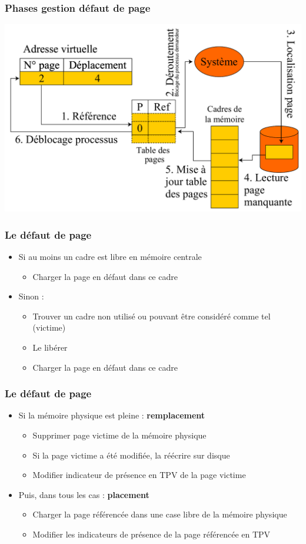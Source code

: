 \begin{frame}
\frametitle{Phases gestion défaut de page}
\includegraphics[width=\textwidth]{../illustration/traitement_defaut_page.pdf}
\end{frame}


\begin{frame}
\frametitle{Le défaut de page}
\begin{itemize}
\item Si au moins un cadre est libre en mémoire centrale
\begin{itemize}
\item Charger la page en défaut dans ce cadre
\end{itemize}
\item Sinon :
\begin{itemize}
\item Trouver un cadre non utilisé ou pouvant être considéré comme tel (victime)
\item Le libérer
\item Charger la page en défaut dans ce cadre
\end{itemize}
\end{itemize}

\end{frame}


\begin{frame}
\frametitle{Le défaut de page}
\begin{itemize}
\item Si la mémoire physique est pleine : \textbf{remplacement}
\begin{itemize}
\item Supprimer page victime de la mémoire physique
\item Si la page victime a été modifiée, la réécrire sur disque  
\item Modifier indicateur de présence en TPV de la page victime
\end{itemize}
\item Puis, dans tous les cas : \textbf{placement}
\begin{itemize}
\item Charger la page référencée dans une case libre de la mémoire physique
\item Modifier les indicateurs de présence de la page référencée en TPV
\end{itemize}
\end{itemize}
\end{frame}


